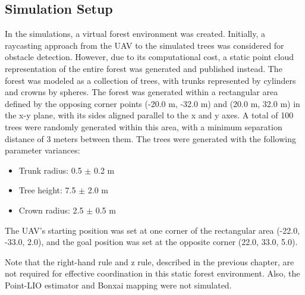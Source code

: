         \subsection{Simulation Setup}
            In the simulations, a virtual forest environment was created. 
            Initially, a raycasting approach from the \ac{UAV} to the simulated trees was considered for obstacle detection. 
            However, due to its computational cost, a static point cloud representation of the entire forest was generated and published instead. 
            The forest was modeled as a collection of trees, with trunks represented by cylinders and crowns by spheres.
            The forest was generated within a rectangular area defined by the opposing corner points (-20.0 m, -32.0 m) and (20.0 m, 32.0 m) in the x-y plane, with its sides aligned parallel to the x and y axes.
            A total of 100 trees were randomly generated within this area, with a minimum separation distance of 3 meters between them. 
            The trees were generated with the following parameter variances:
            \begin{itemize}
                \item Trunk radius: 0.5 $\pm$ 0.2 m
                \item Tree height: 7.5 $\pm$ 2.0 m
                \item Crown radius: 2.5 $\pm$ 0.5 m
            \end{itemize}
            The \ac{UAV}'s starting position was set at one corner of the rectangular area (-22.0, -33.0, 2.0), and the goal position was set at the opposite corner (22.0, 33.0, 5.0).

            Note that the right-hand rule and z rule, described in the previous chapter, are not required for effective coordination in this static forest environment.
            Also, the \ac{Point-LIO} estimator and Bonxai mapping were not simulated.

